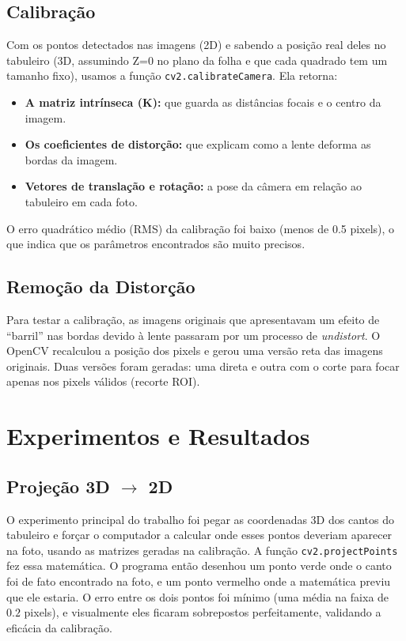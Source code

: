 \documentclass[twocolumn]{article}
\begin{document}
\subsection{Calibração}
Com os pontos detectados nas imagens (2D) e sabendo a posição real deles no tabuleiro (3D, assumindo Z=0 no plano da folha e que cada quadrado tem um tamanho fixo), usamos a função \texttt{cv2.calibrateCamera}.
Ela retorna:
\begin{itemize}
    \item \textbf{A matriz intrínseca (K):} que guarda as distâncias focais e o centro da imagem.
    \item \textbf{Os coeficientes de distorção:} que explicam como a lente deforma as bordas da imagem.
    \item \textbf{Vetores de translação e rotação:} a pose da câmera em relação ao tabuleiro em cada foto.
\end{itemize}

O erro quadrático médio (RMS) da calibração foi baixo (menos de 0.5 pixels), o que indica que os parâmetros encontrados são muito precisos.

\subsection{Remoção da Distorção}
Para testar a calibração, as imagens originais que apresentavam um efeito de ``barril'' nas bordas devido à lente passaram por um processo de \textit{undistort}. O OpenCV recalculou a posição dos pixels e gerou uma versão reta das imagens originais. Duas versões foram geradas: uma direta e outra com o corte para focar apenas nos pixels válidos (recorte ROI).

\section{Experimentos e Resultados}

\subsection{Projeção 3D $\rightarrow$ 2D}
O experimento principal do trabalho foi pegar as coordenadas 3D dos cantos do tabuleiro e forçar o computador a calcular onde esses pontos deveriam aparecer na foto, usando as matrizes geradas na calibração. A função \texttt{cv2.projectPoints} fez essa matemática.
O programa então desenhou um ponto verde onde o canto foi de fato encontrado na foto, e um ponto vermelho onde a matemática previu que ele estaria. O erro entre os dois pontos foi mínimo (uma média na faixa de $0.2$ pixels), e visualmente eles ficaram sobrepostos perfeitamente, validando a eficácia da calibração.
\end{document}
